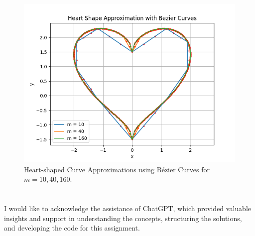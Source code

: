 \documentclass[a4paper]{article}
\begin{document}
\begin{figure}[H]
    \centering
    \includegraphics[scale=0.5]{F.png}
    \caption{Heart-shaped Curve Approximations using Bézier Curves for \( m = 10, 40, 160 \).}
    \label{fig:bezier}
\end{figure}

\section*{}
I would like to acknowledge the assistance of ChatGPT, which provided valuable insights and support in understanding the concepts, structuring the solutions, and developing the code for this assignment. 
\end{document}
